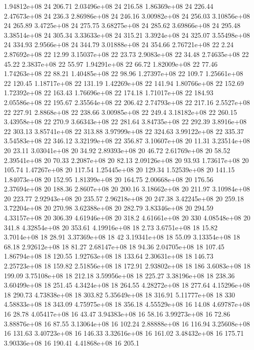 1.94812e+08 24 206.71
2.03496e+08 24 216.58
1.86369e+08 24 226.44
2.47673e+08 24 236.3
2.86986e+08 24 246.16
3.00982e+08 24 256.03
3.10856e+08 24 265.89
3.4725e+08 24 275.75
3.68275e+08 24 285.62
3.69866e+08 24 295.48
3.38514e+08 24 305.34
3.33633e+08 24 315.21
3.3924e+08 24 325.07
3.55498e+08 24 334.93
2.9566e+08 24 344.79
3.01888e+08 24 354.66
2.76721e+08 22 2.24
2.87692e+08 22 12.99
3.15037e+08 22 23.73
2.9083e+08 22 34.48
2.74635e+08 22 45.22
2.3837e+08 22 55.97
1.94291e+08 22 66.72
1.82009e+08 22 77.46
1.74263e+08 22 88.21
1.40485e+08 22 98.96
1.27397e+08 22 109.7
1.25661e+08 22 120.45
1.18717e+08 22 131.19
1.42269e+08 22 141.94
1.80766e+08 22 152.69
1.72392e+08 22 163.43
1.76696e+08 22 174.18
1.71017e+08 22 184.93
2.05586e+08 22 195.67
2.35564e+08 22 206.42
2.74793e+08 22 217.16
2.5527e+08 22 227.91
2.8868e+08 22 238.66
3.00985e+08 22 249.4
3.18182e+08 22 260.15
3.43958e+08 22 270.9
3.66343e+08 22 281.64
3.84735e+08 22 292.39
3.8916e+08 22 303.13
3.85741e+08 22 313.88
3.97999e+08 22 324.63
3.99122e+08 22 335.37
3.54583e+08 22 346.12
3.32199e+08 22 356.87
3.10607e+08 20 11.31
3.23514e+08 20 23.11
3.03041e+08 20 34.92
2.89393e+08 20 46.72
2.61769e+08 20 58.52
2.39541e+08 20 70.33
2.2087e+08 20 82.13
2.09126e+08 20 93.93
1.73617e+08 20 105.74
1.47267e+08 20 117.54
1.25445e+08 20 129.34
1.52539e+08 20 141.15
1.84073e+08 20 152.95
1.81399e+08 20 164.75
2.00668e+08 20 176.56
2.37694e+08 20 188.36
2.8607e+08 20 200.16
3.18662e+08 20 211.97
3.10984e+08 20 223.77
2.92943e+08 20 235.57
2.96218e+08 20 247.38
3.42245e+08 20 259.18
3.72204e+08 20 270.98
3.62388e+08 20 282.79
3.83346e+08 20 294.59
4.33157e+08 20 306.39
4.61946e+08 20 318.2
4.61661e+08 20 330
4.08548e+08 20 341.8
4.32854e+08 20 353.61
4.19916e+08 18 2.73
3.6751e+08 18 15.82
3.7014e+08 18 28.91
3.37369e+08 18 42
3.19341e+08 18 55.09
3.13354e+08 18 68.18
2.92612e+08 18 81.27
2.68147e+08 18 94.36
2.04705e+08 18 107.45
1.86794e+08 18 120.55
1.92763e+08 18 133.64
2.30631e+08 18 146.73
2.25723e+08 18 159.82
2.51856e+08 18 172.91
2.93802e+08 18 186
3.6083e+08 18 199.09
3.75108e+08 18 212.18
3.59956e+08 18 225.27
3.38196e+08 18 238.36
3.60499e+08 18 251.45
4.3424e+08 18 264.55
4.28272e+08 18 277.64
4.15296e+08 18 290.73
4.73838e+08 18 303.82
5.35649e+08 18 316.91
5.11777e+08 18 330
4.58833e+08 18 343.09
4.75975e+08 18 356.18
4.55529e+08 16 14.08
4.69787e+08 16 28.78
4.05417e+08 16 43.47
3.94383e+08 16 58.16
3.99273e+08 16 72.86
3.88876e+08 16 87.55
3.13064e+08 16 102.24
2.88888e+08 16 116.94
3.25608e+08 16 131.63
3.40723e+08 16 146.33
3.32616e+08 16 161.02
3.48432e+08 16 175.71
3.90336e+08 16 190.41
4.41868e+08 16 205.1
